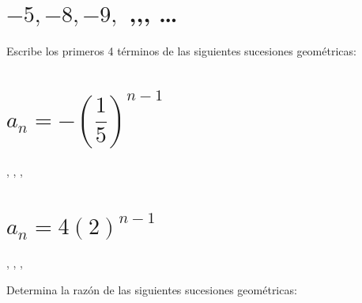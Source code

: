 \documentclass[12pt,addpoints,answers]{evalua}
\begin{document}
\begin{questions}
\begin{multicols}{2}
\begin{parts}
            \begin{solutionbox}{3cm}
            \end{solutionbox}

            \part {\Large $-5,-8,-9,$ \fillin[-8][0.5cm],\fillin[-5][0.5cm],\fillin[0][0.5cm], \dots}

            \begin{solutionbox}{3cm}
            \end{solutionbox}

        \end{parts}
    \end{multicols}


    \question[6] Escribe los primeros 4 términos de las siguientes sucesiones geométricas:
    \begin{multicols}{2}
        \begin{parts}
            \part { \Large$a_{n}=-\left( \dfrac{1}{5}\right)^{n-1}$}

            \begin{solutionbox}{2cm}
                \fillin[$-1$][0cm], \fillin[$-\dfrac{1}{5}$][0cm], \fillin[$-\dfrac{1}{25}$][0cm], \fillin[$-\dfrac{1}{125}$][0cm]
            \end{solutionbox}

            \part { \Large$a_{n}=4\left( 2\right)^{n-1}$}

            \begin{solutionbox}{2cm}
                \fillin[$4$][0cm], \fillin[$8$][0cm], \fillin[$16$][0cm], \fillin[$32$][0cm]
            \end{solutionbox}
        \end{parts}
    \end{multicols}

    \question[6] Determina la razón de las siguientes sucesiones geométricas:
    \begin{multicols}{2}
        \begin{parts}

\end{parts}
\end{multicols}
\end{questions}
\end{document}
